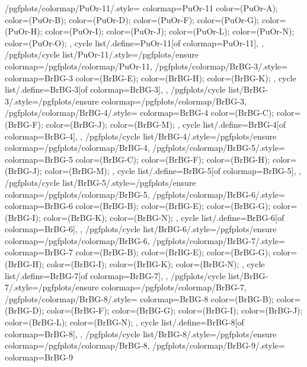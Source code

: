 {  %
  /pgfplots/colormap/PuOr-11/.style={
    colormap={PuOr-11}{
      color=(PuOr-A);
      color=(PuOr-B);
      color=(PuOr-D);
      color=(PuOr-F);
      color=(PuOr-G);
      color=(PuOr-H);
      color=(PuOr-I);
      color=(PuOr-J);
      color=(PuOr-L);
      color=(PuOr-N);
      color=(PuOr-O);
    },
    cycle list/.define={PuOr-11}{[of colormap=PuOr-11]},
  },
  /pgfplots/cycle list/PuOr-11/.style={/pgfplots/ensure colormap={/pgfplots/colormap/PuOr-11}},
  /pgfplots/colormap/BrBG-3/.style={
    colormap={BrBG-3}{
      color=(BrBG-E);
      color=(BrBG-H);
      color=(BrBG-K);
    },
    cycle list/.define={BrBG-3}{[of colormap=BrBG-3]},
  },
  /pgfplots/cycle list/BrBG-3/.style={/pgfplots/ensure colormap={/pgfplots/colormap/BrBG-3}},
  /pgfplots/colormap/BrBG-4/.style={
    colormap={BrBG-4}{
      color=(BrBG-C);
      color=(BrBG-F);
      color=(BrBG-J);
      color=(BrBG-M);
    },
    cycle list/.define={BrBG-4}{[of colormap=BrBG-4]},
  },
  /pgfplots/cycle list/BrBG-4/.style={/pgfplots/ensure colormap={/pgfplots/colormap/BrBG-4}},
  /pgfplots/colormap/BrBG-5/.style={
    colormap={BrBG-5}{
      color=(BrBG-C);
      color=(BrBG-F);
      color=(BrBG-H);
      color=(BrBG-J);
      color=(BrBG-M);
    },
    cycle list/.define={BrBG-5}{[of colormap=BrBG-5]},
  },
  /pgfplots/cycle list/BrBG-5/.style={/pgfplots/ensure colormap={/pgfplots/colormap/BrBG-5}},
  /pgfplots/colormap/BrBG-6/.style={
    colormap={BrBG-6}{
      color=(BrBG-B);
      color=(BrBG-E);
      color=(BrBG-G);
      color=(BrBG-I);
      color=(BrBG-K);
      color=(BrBG-N);
    },
    cycle list/.define={BrBG-6}{[of colormap=BrBG-6]},
  },
  /pgfplots/cycle list/BrBG-6/.style={/pgfplots/ensure colormap={/pgfplots/colormap/BrBG-6}},
  /pgfplots/colormap/BrBG-7/.style={
    colormap={BrBG-7}{
      color=(BrBG-B);
      color=(BrBG-E);
      color=(BrBG-G);
      color=(BrBG-H);
      color=(BrBG-I);
      color=(BrBG-K);
      color=(BrBG-N);
    },
    cycle list/.define={BrBG-7}{[of colormap=BrBG-7]},
  },
  /pgfplots/cycle list/BrBG-7/.style={/pgfplots/ensure colormap={/pgfplots/colormap/BrBG-7}},
  /pgfplots/colormap/BrBG-8/.style={
    colormap={BrBG-8}{
      color=(BrBG-B);
      color=(BrBG-D);
      color=(BrBG-F);
      color=(BrBG-G);
      color=(BrBG-I);
      color=(BrBG-J);
      color=(BrBG-L);
      color=(BrBG-N);
    },
    cycle list/.define={BrBG-8}{[of colormap=BrBG-8]},
  },
  /pgfplots/cycle list/BrBG-8/.style={/pgfplots/ensure colormap={/pgfplots/colormap/BrBG-8}},
  /pgfplots/colormap/BrBG-9/.style={
    colormap={BrBG-9}{
}}}
